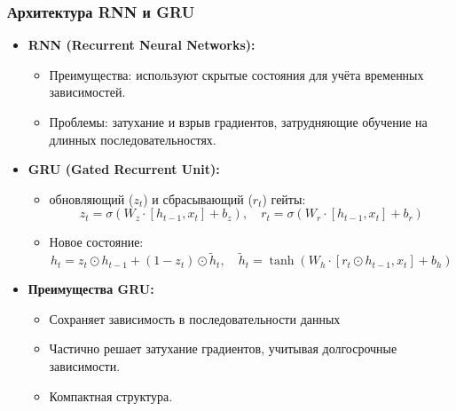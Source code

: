 \documentclass
  [ russian
  , aspectratio=1610 %
  ] {beamer}
\begin{document}
\begin{frame}
    \frametitle{Архитектура RNN и GRU}
    \begin{itemize}
        \item \textbf{RNN (Recurrent Neural Networks):}
        \begin{itemize}
            \item Преимущества: используют скрытые состояния для учёта временных зависимостей.
            \item Проблемы: затухание и взрыв градиентов, затрудняющие обучение на длинных последовательностях.
        \end{itemize}
        \item \textbf{GRU (Gated Recurrent Unit):}
        \begin{itemize}
            \item обновляющий (\( z_t \)) и сбрасывающий (\( r_t \)) гейты:
            \[
            z_t = \sigma(W_z \cdot [h_{t-1}, x_t] + b_z), \quad
            r_t = \sigma(W_r \cdot [h_{t-1}, x_t] + b_r)
            \]
            \item Новое состояние:
            \[
            h_t = z_t \odot h_{t-1} + (1 - z_t) \odot \tilde{h}_t, \quad
            \tilde{h}_t = \tanh(W_h \cdot [r_t \odot h_{t-1}, x_t] + b_h)
            \]
        \end{itemize}
        \item \textbf{Преимущества GRU:}
        \begin{itemize}
            \item Сохраняет зависимость в последовательности данных
            \item Частично решает затухание градиентов, учитывая долгосрочные зависимости.
            \item Компактная структура.
        \end{itemize}
    \end{itemize}
\end{frame}
\end{document}
